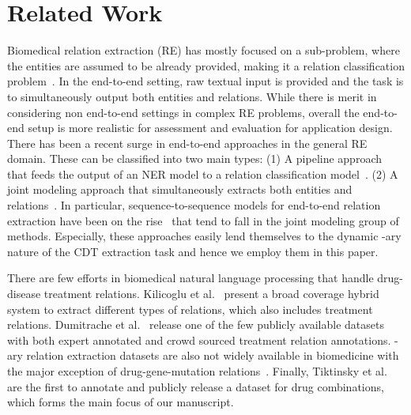 \documentclass[conference]{IEEEtran}
\begin{document}
\section{Related Work}
Biomedical relation extraction (RE)  has mostly focused on a sub-problem, where the entities are assumed to be already provided, making it a relation classification problem~\cite{rink2011automatic,kavuluru2017extracting,liu2016dependency,peng2018extracting}. In the end-to-end setting, raw textual input is provided and the task is to simultaneously output both entities and relations. While there is merit in considering non end-to-end settings in complex RE problems, overall the end-to-end setup is more realistic for assessment and evaluation for application design.
There has been a recent surge in end-to-end approaches in the general RE domain. These can be classified into two main types: (1) A pipeline approach that feeds the output of an NER model to a relation classification model~\cite{zhong-chen-2021-frustratingly}. (2) A joint modeling approach that simultaneously extracts both entities and relations~\cite{miwa2016end,tran2019neural,bekoulis2018joint}.  
In particular, sequence-to-sequence models for end-to-end relation extraction have been on the rise~\cite{giorgi-etal-2022-sequence,zeng-etal-2018-extracting,zeng2020copymtl,nayak2020effective} that tend to fall in the joint modeling group of methods. Especially, these approaches easily lend themselves to the dynamic -ary nature of the CDT extraction task and hence we employ them in this paper. 

There are few efforts in biomedical natural language processing that handle drug-disease treatment relations. Kilicoglu et al.~\cite{kilicoglu2020broad} present a broad coverage hybrid system to extract different types of relations, which also includes treatment relations. Dumitrache et al.~\cite{dumitrache2018crowdsourcing} release one of the few publicly available datasets with both expert annotated and crowd sourced treatment relation annotations. -ary relation extraction datasets are also not widely available in biomedicine with the major exception of drug-gene-mutation relations~\cite{peng-etal-2017-cross}.  Finally, Tiktinsky et al.~\cite{tiktinsky-etal-2022-dataset} are the first to annotate and publicly release a dataset for drug combinations, which forms the main focus of our manuscript. 
\end{document}
